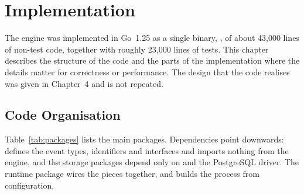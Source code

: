 \clearpage
\chapter{Implementation}

The engine was implemented in Go~1.25 as a single binary, , of
about 43,000 lines of non-test code, together with roughly 23,000 lines of
tests. This chapter describes the structure of the code and the parts of the
implementation where the details matter for correctness or performance. The
design that the code realises was given in Chapter~4 and is not repeated.

\section{Code Organisation}

Table~\ref{tab:packages} lists the main packages. Dependencies point
downwards:  defines the event types, identifiers and interfaces and
imports nothing from the engine, and the storage packages depend only on
 and the PostgreSQL driver. The runtime package wires the pieces
together, and  builds the process from configuration.

